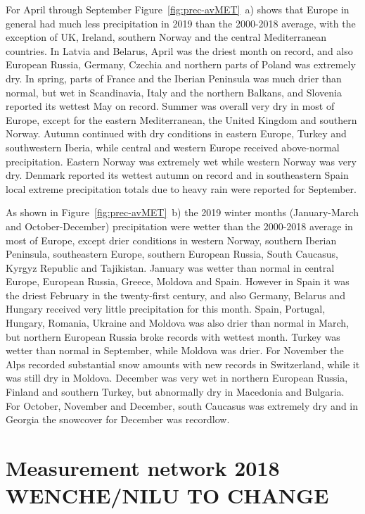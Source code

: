 For April through September  Figure~\ref{fig:prec-avMET}~a) shows that Europe in general had much less precipitation in 2019 than the 2000-2018 average, with the exception of UK, Ireland, southern Norway and the central Mediterranean countries. In Latvia and Belarus, April was the driest month on record, and also European Russia, Germany, Czechia and northern parts of Poland was extremely dry. In spring, parts of France and the Iberian Peninsula was much drier than normal, but wet in Scandinavia, Italy and the northern Balkans, and Slovenia reported its wettest May on record. Summer was overall very dry in most of Europe, except for the eastern Mediterranean, the United Kingdom and southern Norway. Autumn continued with dry conditions in eastern Europe, Turkey and southwestern Iberia, while central and western Europe received above-normal precipitation. Eastern Norway was extremely wet while western Norway was very dry. Denmark reported its wettest autumn on record and in southeastern Spain local extreme precipitation totals due to heavy rain were reported for September.

As shown in Figure~\ref{fig:prec-avMET}~b) the 2019 winter months (January-March and October-December) precipitation were wetter than the 2000-2018 average in most of Europe, except drier conditions in western Norway, southern Iberian Peninsula, southeastern Europe, southern European Russia, South Caucasus, Kyrgyz Republic
and Tajikistan. January was wetter than normal in central Europe, European Russia, Greece, Moldova and Spain. However in Spain it was the driest February in the twenty-first century, and also Germany, Belarus and Hungary received very little precipitation for this month. Spain, Portugal, Hungary, Romania, Ukraine and Moldova was also drier than normal in March, but northern European Russia broke records with wettest month. Turkey was wetter than normal in September, while Moldova was drier. For November the Alps recorded substantial snow amounts with new records in Switzerland, while it was still dry in Moldova. December was very wet in northern European Russia, Finland and southern Turkey, but abnormally dry in Macedonia and Bulgaria. For October, November and December, south Caucasus was extremely dry and in Georgia the snowcover for December was recordlow.


\section{Measurement network 2018 WENCHE/NILU TO CHANGE} 
\label{Obs_2018}

